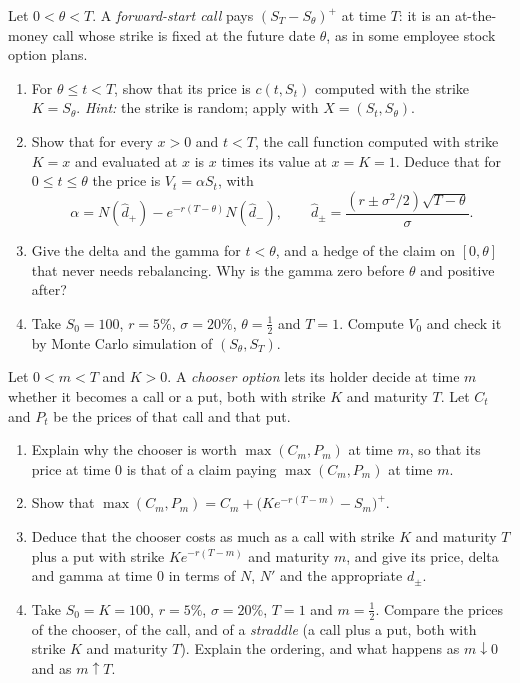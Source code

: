 \begin{exercise}\label{ex:bs-forward-start}
\medium Let $0<\theta<T$. A \emph{forward-start call} pays $(S_T-S_\theta)^+$ at time $T$: it
is an at-the-money call whose strike is fixed at the future date $\theta$, as in some employee
stock option plans.
\begin{enumerate}[label=(\alph*)]
  \item For $\theta\le t<T$, show that its price is $c(t,S_t)$ computed with the strike
    $K=S_\theta$. \emph{Hint:} the strike is random; apply 
    with $X=(S_t,S_\theta)$.
  \item Show that for every $x>0$ and $t<T$, the call function computed with strike $K=x$
    and evaluated at $x$ is $x$ times its value at $x=K=1$. Deduce that for
    $0\le t\le\theta$ the price is $V_t=\alpha S_t$, with
    \[
      \alpha=N(\hat d_+)-e^{-r(T-\theta)}N(\hat d_-),\qquad
      \hat d_\pm=\frac{(r\pm\sigma^2/2)\sqrt{T-\theta}}{\sigma}.
    \]
  \item Give the delta and the gamma for $t<\theta$, and a hedge of the claim on $[0,\theta]$
    that never needs rebalancing. Why is the gamma zero before $\theta$ and positive
    after?
  \item Take $S_0=100$, $r=5\%$, $\sigma=20\%$, $\theta=\frac12$ and $T=1$. Compute $V_0$ and
    check it by Monte Carlo simulation of $(S_\theta,S_T)$.
\end{enumerate}
\end{exercise}

\begin{exercise}\label{ex:bs-chooser}
\medium Let $0<m<T$ and $K>0$. A \emph{chooser option} lets its holder decide at time $m$
whether it becomes a call or a put, both with strike $K$ and maturity $T$. Let $C_t$ and
$P_t$ be the prices of that call and that put.
\begin{enumerate}[label=(\alph*)]
  \item Explain why the chooser is worth $\max(C_m,P_m)$ at time $m$, so that its price at
    time $0$ is that of a claim paying $\max(C_m,P_m)$ at time $m$.
  \item Show that $\max(C_m,P_m)=C_m+\big(Ke^{-r(T-m)}-S_m\big)^+$.
  \item Deduce that the chooser costs as much as a call with strike $K$ and maturity $T$
    plus a put with strike $Ke^{-r(T-m)}$ and maturity $m$, and give its price, delta and
    gamma at time $0$ in terms of $N$, $N'$ and the appropriate $d_\pm$.
  \item Take $S_0=K=100$, $r=5\%$, $\sigma=20\%$, $T=1$ and $m=\frac12$. Compare the prices of
    the chooser, of the call, and of a \emph{straddle} (a call plus a put, both with strike
    $K$ and maturity $T$). Explain the ordering, and what happens as $m\downarrow0$ and as
    $m\uparrow T$.
\end{enumerate}
\end{exercise}

